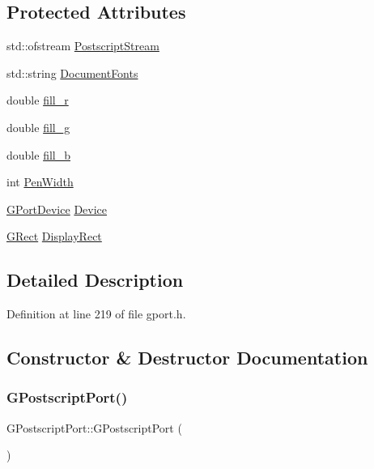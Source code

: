 \subsection*{Protected Attributes}
\begin{DoxyCompactItemize}
\item 
std\+::ofstream \mbox{\hyperlink{class_g_postscript_port_a0fb398f1c65b3ccb0efccd509f60d20d}{Postscript\+Stream}}
\item 
std\+::string \mbox{\hyperlink{class_g_postscript_port_adcdefa9db439190c69b85b171192e773}{Document\+Fonts}}
\item 
double \mbox{\hyperlink{class_g_postscript_port_ab2a7d722f2cc8624ba2deccce41d287d}{fill\+\_\+r}}
\item 
double \mbox{\hyperlink{class_g_postscript_port_a50c6a0edf2edfb66f6a57b7cf847f2e2}{fill\+\_\+g}}
\item 
double \mbox{\hyperlink{class_g_postscript_port_a60fd8f27f76db55846837e93ccf5f582}{fill\+\_\+b}}
\item 
int \mbox{\hyperlink{class_g_base_port_a9a76c3a8af8d0e9f29035d02d8f038c1}{Pen\+Width}}
\item 
\mbox{\hyperlink{gport_8h_a595e501a3b83fde14c760260fbfb153f}{G\+Port\+Device}} \mbox{\hyperlink{class_g_base_port_a14275a027c8665d5fa4941e148a1b46a}{Device}}
\item 
\mbox{\hyperlink{class_g_rect}{G\+Rect}} \mbox{\hyperlink{class_g_base_port_ac0e1180ebadeed5d3c7d0291db1bdf29}{Display\+Rect}}
\end{DoxyCompactItemize}


\subsection{Detailed Description}


Definition at line 219 of file gport.\+h.



\subsection{Constructor \& Destructor Documentation}
\mbox{\label{class_g_postscript_port_ad6dc52974d36561520b126452bd12e1f}} 
\subsubsection{\texorpdfstring{G\+Postscript\+Port()}{GPostscriptPort()}}
{\footnotesize\ttfamily G\+Postscript\+Port\+::\+G\+Postscript\+Port (\begin{DoxyParamCaption}{ }\end{DoxyParamCaption})}



